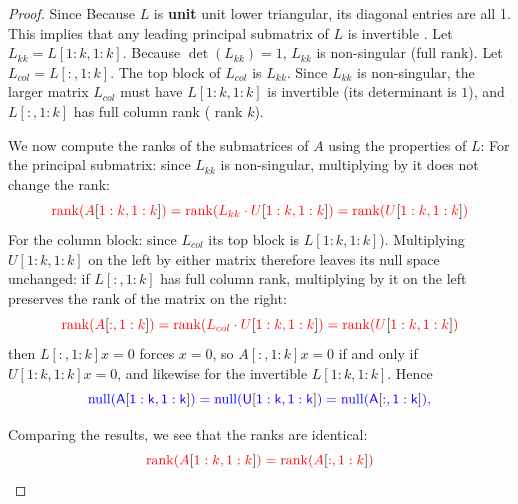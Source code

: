 \documentclass[10pt,twoside]{siamart1116}
\DeclareMathOperator{\rk}{rank}
\DeclareMathOperator{\nl}{null}
\numberwithin{theorem}{section}
\providecommand{\DIFadd}[1]{{\protect\color{blue} \sf #1}} %
\providecommand{\DIFdel}[1]{{\protect\color{red} \scriptsize #1}} %
\providecommand{\DIFaddbegin}{} %
\providecommand{\DIFaddend}{} %
\providecommand{\DIFdelbegin}{} %
\providecommand{\DIFdelend}{} %
\begin{document}
\begin{proof}
\DIFdel{Since }\DIFdelend \DIFaddbegin \DIFadd{Because }\DIFaddend $L$ is \DIFdelbegin \DIFdel{\textbf{unit} }\DIFdelend \DIFaddbegin \DIFadd{unit }\DIFaddend lower triangular, \DIFdelbegin \DIFdel{its diagonal entries are all 1. This implies that any leading principal submatrix of $L$ is invertible .
	}%
\DIFdel{Let $L_{kk} = L[1:k, 1:k]$. Because $\det(L_{kk}) = 1$, $L_{kk}$ is non-singular (full rank).
		}%
\DIFdel{Let $L_{col} = L[:, 1:k]$. The top block of $L_{col}$ is $L_{kk}$. Since $L_{kk}$ is non-singular, the larger matrix $L_{col}$ must have }\DIFdelend \DIFaddbegin \DIFadd{$L[1:k, 1:k]$ is invertible (its determinant is $1$), and $L[:, 1:k]$ has }\DIFaddend full column rank (\DIFdelbegin \DIFdel{rank $k$). }%

\DIFdel{We now compute the ranks of the submatrices of $A$ using the properties of $L$:
	}%
\DIFdel{For the principal submatrix: since $L_{kk}$ is non-singular, multiplying by it does not change the rank: }\[ \DIFdel{\rk(A}[\DIFdel{1:k, 1:k}]\DIFdel{) = \rk(L_{kk} \cdot U}[\DIFdel{1:k, 1:k}]\DIFdel{) = \rk(U}[\DIFdel{1:k, 1:k}]\DIFdel{) }\]%
\DIFdel{For the column block: since $L_{col}$ }\DIFdelend \DIFaddbegin \DIFadd{its top block is $L[1:k, 1:k]$). Multiplying $U[1:k, 1:k]$ on the left by either matrix therefore leaves its null space unchanged: if $L[:, 1:k]$ }\DIFaddend has full column rank, \DIFdelbegin \DIFdel{multiplying by it on the left preserves the rank of the matrix on the right:
		}\[ \DIFdel{\rk(A}[\DIFdel{:, 1:k}]\DIFdel{) = \rk(L_{col} \cdot U}[\DIFdel{1:k, 1:k}]\DIFdel{) = \rk(U}[\DIFdel{1:k, 1:k}]\DIFdel{) }\]%
\DIFdelend \DIFaddbegin \DIFadd{then $L[:, 1:k] x = 0$ forces $x = 0$, so $A[:, 1:k] x = 0$ if and only if $U[1:k, 1:k] x = 0$, and likewise for the invertible $L[1:k, 1:k]$. Hence
  }\[
    \DIFadd{\nl(A}[\DIFadd{1:k, 1:k}]\DIFadd{) = \nl(U}[\DIFadd{1:k, 1:k}]\DIFadd{) = \nl(A}[\DIFadd{:, 1:k}]\DIFadd{),
  }\]\DIFaddend 
  \DIFdelbegin %

\DIFdel{Comparing the results, we see that the ranks are identical:
	}\[ \DIFdel{\rk(A}[\DIFdel{1:k, 1:k}]\DIFdel{) = \rk(A}[\DIFdel{:, 1:k}]\DIFdel{) }\]%


\end{proof}
\end{document}
